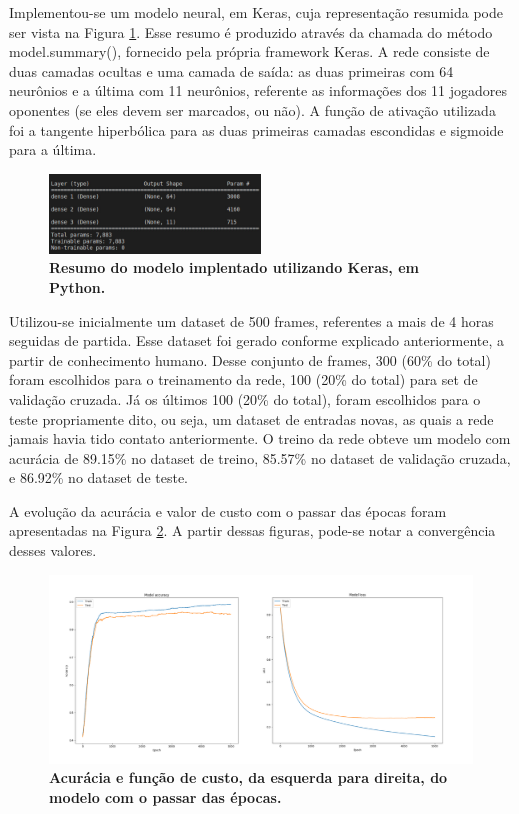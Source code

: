 \documentclass[10pt,fleqn,a4paper]{article}
\begin{document}
    Implementou-se um modelo neural, em Keras, cuja representação resumida pode ser vista na Figura \ref{fig:model-summary}. Esse resumo é produzido através da chamada do método model.summary(), fornecido pela própria framework Keras. A rede consiste de duas camadas ocultas e uma camada de saída: as duas primeiras com 64 neurônios e a última com 11 neurônios, referente as informações dos 11 jogadores oponentes (se eles devem ser marcados, ou não). A função de ativação utilizada foi a tangente hiperbólica para as duas primeiras camadas escondidas e sigmoide para a última.
    
\begin{figure}[H]
\centering
\includegraphics[width=0.5\textwidth]{figures/model-summary.jpeg}
\caption{\textbf{Resumo do modelo implentado utilizando Keras, em Python.}} \label{fig:model-summary}
\end{figure}

	Utilizou-se inicialmente um dataset de 500 frames, referentes a mais de 4 horas seguidas de partida. Esse dataset foi gerado conforme explicado anteriormente, a partir de conhecimento humano. Desse conjunto de frames, 300 (60\% do total) foram escolhidos para o treinamento da rede, 100 (20\% do total) para set de validação cruzada. Já os últimos 100 (20\% do total), foram escolhidos para o teste propriamente dito, ou seja, um dataset de entradas novas, as quais a rede jamais havia tido contato anteriormente. O treino da rede obteve um modelo com acurácia de 89.15\% no dataset de treino, 85.57\% no dataset de validação cruzada, e 86.92\% no dataset de teste.
	
	A evolução da acurácia e valor de custo com o passar das épocas foram apresentadas na Figura \ref{fig:acc-loss}. A partir dessas figuras, pode-se notar a convergência desses valores.
	
\begin{figure}[H]
	\centering
	\includegraphics[width=1.05\textwidth]{figures/model-accuracy-loss.png}
   \caption{\textbf{Acurácia e função de custo, da esquerda para direita, do modelo com o passar das épocas.}} \label{fig:acc-loss}
\end{figure}
	
\end{document}
